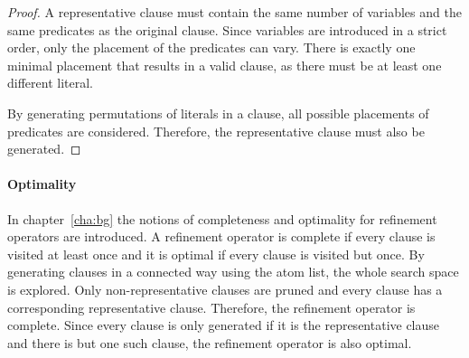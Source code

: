 \begin{proof}
	A representative clause must contain the same number of variables and the same predicates as the original clause.
	Since variables are introduced in a strict order, only the placement of the predicates can vary.
	There is exactly one minimal placement that results in a valid clause, as there must be at least one different literal.

	By generating permutations of literals in a clause, all possible placements of predicates are considered.
	Therefore, the representative clause must also be generated.
\end{proof}

\paragraph{Optimality}
In chapter~\ref{cha:bg} the notions of completeness and optimality for refinement operators are introduced.
A refinement operator is complete if every clause is visited at least once and it is optimal if every clause is visited but once.
By generating clauses in a connected way using the atom list, the whole search space is explored.
Only non-representative clauses are pruned and every clause has a corresponding representative clause.
Therefore, the refinement operator is complete.
Since every clause is only generated if it is the representative clause and there is but one such clause, the refinement operator is also optimal.








